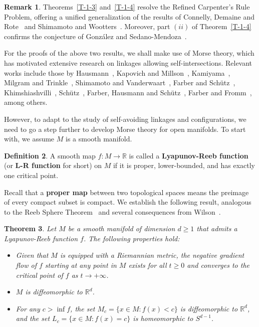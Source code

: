 \documentclass[11pt,letterpaper]{amsart}
\theoremstyle{plain}
\newtheorem{theorem}{Theorem}[section]
\theoremstyle{definition}
\newtheorem{definition}[theorem]{Definition}
\newtheorem{remark}[theorem]{Remark}
\theoremstyle{remark}
\numberwithin{equation}{section}
\begin{document}
\begin{remark}
Theorems~\ref{T-1-3} and~\ref{T-1-4} resolve the Refined Carpenter's Rule Problem, offering a unified generalization of the results of Connelly, Demaine and Rote~\cite{Connelly-2003} and Shimamoto and Wootters~\cite{Shimamoto-2014}. Moreover, part $(ii)$ of Theorem~\ref{T-1-4} confirms the conjecture of Gonz\'{a}lez and Sedano-Mendoza~\cite[Conjecture 1.1]{Gonzalez-2023}.
\end{remark}


For the proofs of the above two results, we shall make use of Morse theory, which has motivated extensive research on linkages allowing self-intersections. Relevant works include those by  Hausmann~\cite{Hausmann-1989}, Kapovich and Millson~\cite{Kapovich-1995}, Kamiyama~\cite{Kamiyama-1998}, Milgram and Trinkle~\cite{Milgram-2004}, Shimamoto and Vanderwaart~\cite{Shimamoto-2005}, Farber and Sch\"{u}tz~\cite{Farber-2007}, Khimshiashvilli~\cite{Khimshiashvili-2009}, Sch\"{u}tz~\cite{Schuetz-2010,Schuetz-2013,Schuetz-2016}, Farber, Hausmann and Sch\"{u}tz~\cite{Farber-Hausmann-2011}, Farber and Fromm~\cite{Farber-Fromm-2012}, among others.

However, to adapt to the study of self-avoiding linkages and configurations, we need to go a step further to develop Morse theory for open manifolds. To start with, we assume $M$ is a smooth manifold.

\begin{definition}\label{D-1-6}
A smooth map $f:M\to \mathbb R$ is called a \textbf{Lyapunov-Reeb function} (or \textbf{L-R function} for short) on $M$ if it is proper, lower-bounded, and has exactly one critical point.
\end{definition}

Recall that a \textbf{proper map} between two topological spaces means the preimage of every compact subset is compact. We establish the following result, analogous to the Reeb Sphere Theorem~\cite{Reeb-1946,Milnor-1964} and several consequences from Wilson~\cite{Wilson-1967}.

\begin{theorem}\label{T-1-7}
Let $M$ be a smooth manifold of dimension $d\geq 1$ that admits a Lyapunov-Reeb function $f$. The following properties hold:
\begin{itemize}
\item[$(i)$] Given that $M$ is equipped with a Riemannian metric, the negative gradient flow of $f$ starting at any point in $M$ exists for all $t\geq 0$ and converges to the critical point of $f$ as $t\to+\infty$.
\item[$(ii)$] $M$ is diffeomorphic to $\mathbb R^d$.
\item[$(iii)$] For any $c>\inf f$, the set $M_c=\big\{x\in M: f(x)<c\big\}$ is diffeomorphic to $\mathbb R^d$, and the set $L_c=\big\{x\in M: f(x)=c\big\}$ is homeomorphic to $S^{d-1}$.
\end{itemize}
\end{theorem}
\end{document}
